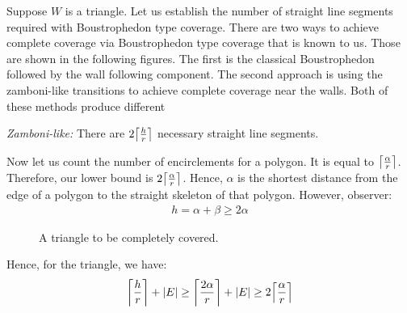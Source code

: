 \documentclass[../main.tex]{subfiles}
\begin{document}
\iffalse
Suppose $W$ is a triangle. Let us establish the number of straight line segments required with Boustrophedon type coverage. There are two ways to achieve complete coverage via Boustrophedon type coverage that is known to us. Those are shown in the following figures. The first is the classical Boustrophedon followed by the wall following component. The second approach is using the zamboni-like transitions to achieve complete coverage near the walls. Both of these methods produce different 


\emph{Zamboni-like:} There are $2\ceil*{\frac{h}{r}}$ necessary straight line segments.

Now let us count the number of encirclements for a polygon. It is equal to $\ceil*{\frac{\alpha}{r}}$. Therefore, our lower bound is $2\ceil*{\frac{\alpha}{r}}$. Hence, $\alpha$ is the shortest distance from the edge of a polygon to the straight skeleton of that polygon. However, observer:
\begin{equation}
\begin{aligned}
h=\alpha+\beta\geq2\alpha
\end{aligned}
\end{equation}

\begin{figure}
	\centering
	
	\caption{A triangle to be completely covered.}
	\label{fig:triangle_1}
\end{figure}

Hence, for the triangle, we have:
\begin{equation}
\begin{aligned}
	\ceil*{\frac{h}{r}}+|E|\geq\ceil*{\frac{2\alpha}{r}}+|E|\geq2\ceil*{\frac{\alpha}{r}} 
\end{aligned}
\end{equation}
\end{document}
